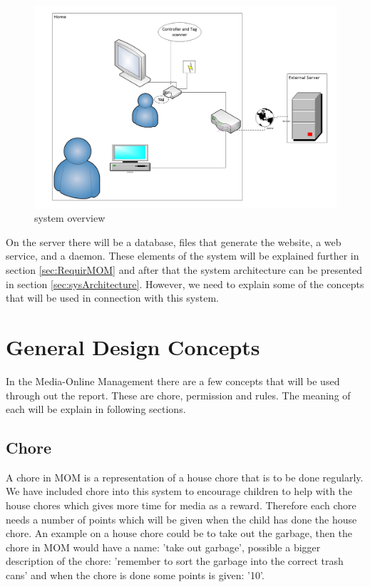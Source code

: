 \begin{figure}
	\centering
		\includegraphics[width=1.00\textwidth]{images/systemoverview.jpg}
	\caption{system overview}
	\label{fig:systemoverview}
\end{figure}

On the server there will be a database, files that generate the website, a web service, and a daemon. These elements of the system will be explained further in section \vref{sec:RequirMOM} and after that the system architecture can be presented in section \vref{sec:sysArchitecture}. However, we need to explain some of the concepts that will be used in connection with this system.

\section{General Design Concepts}
In the Media-Online Management there are a few concepts that will be used through out the report. These are chore, permission and rules. The meaning of each will be explain in following sections.

\subsection{Chore}
A chore in MOM is a representation of a house chore that is to be done regularly. We have included chore into this system to encourage children to help with the house chores which gives more time for media as a reward. Therefore each chore needs a number of points which will be given when the child has done the house chore. 
An example on a house chore could be to take out the garbage, then the chore in MOM would have a name: 'take out garbage', possible a bigger description of the chore: 'remember to sort the garbage into the correct trash cans' and when the chore is done some points is given: '10'.  

